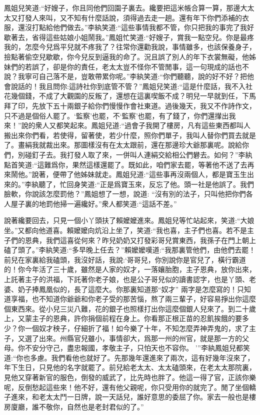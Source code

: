 \begin{parag}
    鳳姐兒笑道:“好嫂子，你且同他們回園子裏去。纔要把這米帳合算一算，那邊大太太又打發人來叫，又不知有什麼話說，須得過去走一趟。還有年下你們添補的衣服，還沒打點給他們做去。”李紈笑道:“這些事情我都不管，你只把我的事完了我好歇著去，省得這些姑娘小姐鬧我。”鳳姐忙笑道:“好嫂子，賞我一點空兒。你是最疼我的，怎麼今兒爲平兒就不疼我了？往常你還勸我說，事情雖多，也該保養身子，撿點著偷空兒歇歇，你今兒反到逼我的命了。況且誤了別人的年下衣裳無礙，他姊妹們的若誤了，卻是你的責任，老太太豈不怪你不管閒事，這一句現成的話也不說？我寧可自己落不是，豈敢帶累你呢。”李紈笑道:“你們聽聽，說的好不好？把他會說話的！我且問你:這詩社你到底管不管？”鳳姐兒笑道:“這是什麼話，我不入社花幾個錢，不成了大觀園的反叛了，還想在這裏喫飯不成？明兒一早就到任，下馬拜了印，先放下五十兩銀子給你們慢慢作會社東道。過後幾天，我又不作詩作文，只不過是個俗人罷了。‘監察’也罷，不‘監察’也罷，有了錢了，你們還攆出我來！”說的衆人又都笑起來。鳳姐兒道:“過會子我開了樓房，凡有這些東西都叫人搬出來你們看，若使得，留著使，若少什麼，照你們單子，我叫人替你們買去就是了。畫絹我就裁出來。那圖樣沒有在太太跟前，還在那邊珍大爺那裏呢。說給你們，別碰釘子去。我打發人取了來，一併叫人連絹交給相公們礬去。如何？”李紈點首笑道:“這難爲你，果然這樣還罷了。既如此，咱們家去罷，等著他不送了去再來鬧他。”說著，便帶了他姊妹就走。鳳姐兒道:“這些事再沒兩個人，都是寶玉生出來的。”李紈聽了，忙回身笑道:“正是爲寶玉來，反忘了他。頭一社是他誤了。我們臉軟，你說該怎麼罰他？”鳳姐想了一想，說道: “沒有別的法子，只叫他把你們各人屋子裏的地罰他掃一遍纔好。”衆人都笑道:“這話不差。”
\end{parag}


\begin{parag}
    說著纔要回去，只見一個小丫頭扶了賴嬤嬤進來。鳳姐兒等忙站起來，笑道:“大娘坐。”又都向他道喜。賴嬤嬤向炕沿上坐了，笑道:“我也喜，主子們也喜。若不是主子們的恩典，我們這喜從何來？昨兒奶奶又打發彩哥兒賞東西，我孫子在門上朝上磕了頭了。”李紈笑道:“多早晚上任去？”賴嬤嬤嘆道:“我那裏管他們，由他們去罷！前兒在家裏給我磕頭，我沒好話，我說:‘哥哥兒，你別說你是官兒了，橫行霸道的！你今年活了三十歲，雖然是人家的奴才，一落孃胎胞，主子恩典，放你出來，上託著主子的洪福，下託著你老子娘，也是公子哥兒似的讀書認字，也是丫頭、老婆、奶子捧鳳凰似的，長了這麼大。你那裏知道那“奴才” 兩字是怎麼寫的！只知道享福，也不知道你爺爺和你老子受的那苦惱，熬了兩三輩子，好容易掙出你這麼個東西來。從小兒三災八難，花的銀子也照樣打出你這麼個銀人兒來了。到二十歲上，又蒙主子的恩典，許你捐個前程在身上。你看那正根正苗的忍飢挨餓的要多少？你一個奴才秧子，仔細折了福！如今樂了十年，不知怎麼弄神弄鬼的，求了主子，又選了出來。州縣官兒雖小，事情卻大，爲那一州的州官，就是那一方的父母。你不安分守己，盡忠報國，孝敬主子，只怕天也不容你。 ’”李紈鳳姐兒都笑道:“你也多慮。我們看他也就好了。先那幾年還進來了兩次，這有好幾年沒來了，年下生日，只見他的名字就罷了。前兒給老太太、太太磕頭來，在老太太那院裏，見他又穿著新官的服色，倒發的威武了，比先時也胖了。他這一得了官，正該你樂呢，反倒愁起這些來！他不好，還有他父親呢，你只受用你的就完了。閒了坐個轎子進來，和老太太鬥一日牌，說一天話兒，誰好意思的委屈了你。家去一般也是樓房廈廳，誰不敬你，自然也是老封君似的了。”
\end{parag}


